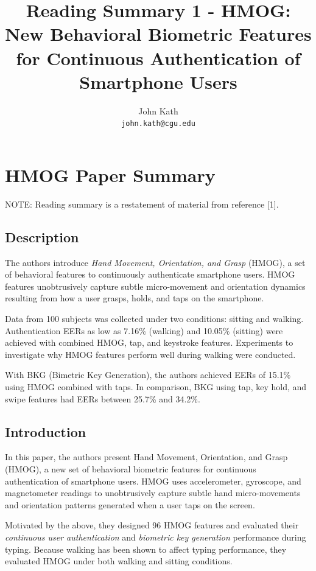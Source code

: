 \documentclass{article}
\title{Reading Summary 1 - HMOG: New Behavioral Biometric Features for Continuous Authentication of Smartphone Users}
\author{
  John Kath \\
  \texttt{john.kath@cgu.edu} \\
}
\begin{document}
\maketitle


\section{HMOG Paper Summary}

NOTE: Reading summary is a restatement of material from reference [1].

\subsection{Description}

The authors introduce {\em Hand Movement, Orientation, and Grasp} (HMOG), a set of behavioral features to continuously authenticate smartphone users. HMOG features unobtrusively capture subtle micro-movement and orientation dynamics resulting from how a user grasps, holds, and taps on the smartphone.

Data from 100 subjects was collected under two conditions: sitting and walking. Authentication EERs as low as 7.16\% (walking) and 10.05\% (sitting) were achieved with combined HMOG, tap, and keystroke features. Experiments to investigate why HMOG features perform well during walking were conducted.

With BKG (Bimetric Key Generation), the authors achieved EERs of 15.1\% using HMOG combined with taps. In comparison, BKG using tap, key hold, and swipe features had EERs between 25.7\% and 34.2\%.

\subsection{Introduction}

In this paper, the authors present Hand Movement, Orientation, and Grasp (HMOG), a new set of behavioral biometric features for continuous authentication of smartphone users. HMOG uses accelerometer, gyroscope, and magnetometer readings to unobtrusively capture subtle hand micro-movements and orientation patterns generated when a user taps on the screen. 

Motivated by the above, they designed 96 HMOG features and evaluated their {\em continuous user authentication} and {\em biometric key generation} performance during typing. Because walking has been shown to affect typing performance, they evaluated HMOG under both walking and sitting conditions. 
\end{document}
